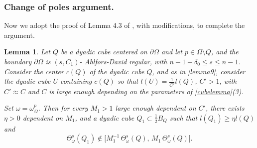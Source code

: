\documentclass{article}
\newcounter{lem}
\theoremstyle{plain}
\theoremstyle{plain}
\newtheorem{lemma}[theorem]{Lemma}
\theoremstyle{definition}
\theoremstyle{plain}
\begin{document}
 
\subsubsection{Change of poles argument.}


Now we adopt the proof of Lemma 4.3 of \cite{Az20}, with modifications, to complete the argument.

\begin{lemma}\label{lemma12}
    Let $Q$ be a dyadic cube centered on $\partial \Omega$ and let
$p \in \Omega \setminus Q$, and the boundary $\partial\Omega$ is $(s,C_1)$- Ahlfors-David regular, with $n-1-\delta_0\leq s\leq n-1$. Consider the center $c(Q)$ of the dyadic cube $Q$, and as in \cref{lemma9}, consider the dyadic cube $U$ containing $c(Q)$ so that $l(U)=\frac{1}{C'}l(Q)$, $C'>1$, with $C'\approx C$ and $C$ is large enough depending on the parameters of \cref{cubelemma}(3).


Set $\omega = \omega^{p}_{\Omega}$.
Then for every $M_1 > 1$ large enough dependent on $C'$, there exists $\eta > 0$ dependent on $M_1$, and a dyadic cube
$Q_1 \subset \tfrac{1}{2} B_Q$ such that
$l(Q_1) \geq \eta l(Q)$ and
\[
\Theta^s_\omega(Q_1)
\notin
\bigl[
M_1^{-1} \, \Theta^s_\omega(Q),
\,
M_1 \, \Theta^s_\omega(Q)
\bigr].
\]
\end{lemma}
\end{document}
